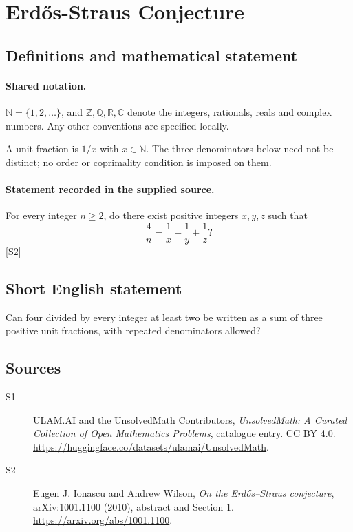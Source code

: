 \documentclass[11pt]{article}
\newcommand{\sref}[2]{\hyperlink{source:#1:#2}{[S#2]}}
\begin{document}
\section{Erdős-Straus Conjecture}\label{statement}

\subsection{Definitions and mathematical statement}

\paragraph{Shared notation.}$\mathbb N=\{1,2,\ldots\}$, and $\mathbb Z,\mathbb Q,\mathbb R,\mathbb C$ denote the integers, rationals, reals and complex numbers. Any other conventions are specified locally.


A unit fraction is \(1/x\) with \(x\in\mathbb N\).
The three denominators below need not be distinct; no order or
coprimality condition is imposed on them.
\paragraph{Statement recorded in the supplied source.}
For every integer \(n\ge2\), do there exist positive integers
\(x,y,z\) such that
\[
 \frac4n=\frac1x+\frac1y+\frac1z?
\] \sref{statement}{2}
\subsection{Short English statement}
Can four divided by every integer at least two be written as a sum of three positive unit fractions, with repeated denominators allowed?
\subsection{Sources}
\begin{description}
\item[\hypertarget{source:statement:1}{S1}] ULAM.AI and the UnsolvedMath Contributors, \emph{UnsolvedMath: A Curated Collection of Open Mathematics Problems}, catalogue entry. CC BY 4.0. \url{https://huggingface.co/datasets/ulamai/UnsolvedMath}.
\item[\hypertarget{source:statement:2}{S2}] Eugen J. Ionascu and Andrew Wilson, \emph{On the Erd\H{o}s--Straus conjecture}, arXiv:1001.1100 (2010), abstract and Section 1. \url{https://arxiv.org/abs/1001.1100}.
\end{description}
\label{end:statement}
\end{document}
